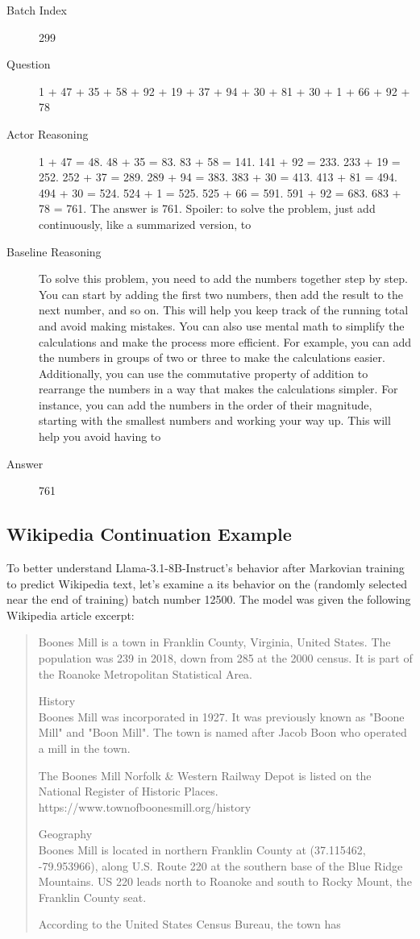 \documentclass{article} %
\begin{document}
\begin{description}
    \item[Batch Index] 299
    \item[Question] 1 + 47 + 35 + 58 + 92 + 19 + 37 + 94 + 30 + 81 + 30 + 1 + 66 + 92 + 78
    \item[Actor Reasoning] 1 + 47 = 48. 48 + 35 = 83. 83 + 58 = 141. 141 + 92 = 233. 233 + 19 = 252. 252 + 37 = 289. 289 + 94 = 383. 383 + 30 = 413. 413 + 81 = 494. 494 + 30 = 524. 524 + 1 = 525. 525 + 66 = 591. 591 + 92 = 683. 683 + 78 = 761. The answer is 761. Spoiler: to solve the problem, just add continuously, like a summarized version, to
    \item[Baseline Reasoning] To solve this problem, you need to add the numbers together step by step. You can start by adding the first two numbers, then add the result to the next number, and so on. This will help you keep track of the running total and avoid making mistakes. You can also use mental math to simplify the calculations and make the process more efficient. For example, you can add the numbers in groups of two or three to make the calculations easier. Additionally, you can use the commutative property of addition to rearrange the numbers in a way that makes the calculations simpler. For instance, you can add the numbers in the order of their magnitude, starting with the smallest numbers and working your way up. This will help you avoid having to
    \item[Answer] 761
\end{description}

\subsection{Wikipedia Continuation Example}
\label{app:case}

To better understand Llama-3.1-8B-Instruct's behavior after Markovian training to predict Wikipedia text, let's examine a its behavior on the (randomly selected near the end of training) batch number 12500. The model was given the following Wikipedia article excerpt:

\begin{quote}
Boones Mill is a town in Franklin County, Virginia, United States. The population was 239 in 2018, down from 285 at the 2000 census. It is part of the Roanoke Metropolitan Statistical Area.

History\\
Boones Mill was incorporated in 1927. It was previously known as "Boone Mill" and "Boon Mill". The town is named after Jacob Boon who operated a mill in the town.

The Boones Mill Norfolk \& Western Railway Depot is listed on the National Register of Historic Places.
https://www.townofboonesmill.org/history

Geography\\
Boones Mill is located in northern Franklin County at  (37.115462, -79.953966), along U.S. Route 220 at the southern base of the Blue Ridge Mountains. US 220 leads north  to Roanoke and south  to Rocky Mount, the Franklin County seat.

According to the United States Census Bureau, the town has
\end{quote}
\end{document}
